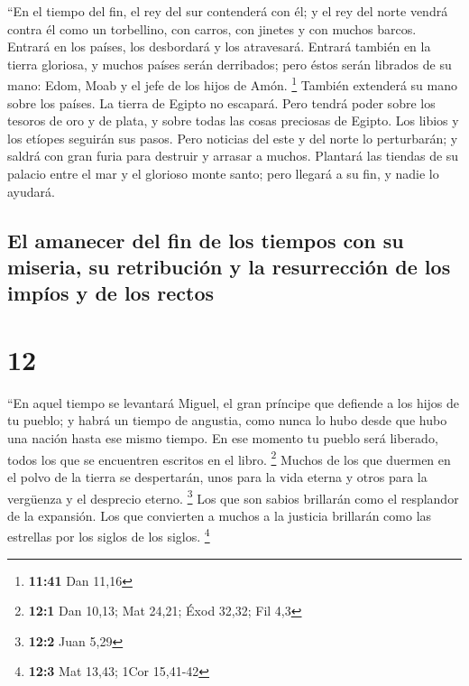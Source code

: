  ``En el tiempo del fin, el rey del sur contenderá con
él; y el rey del norte vendrá contra él como un torbellino, con carros,
con jinetes y con muchos barcos. Entrará en los países, los desbordará y
los atravesará.  Entrará también en la tierra gloriosa, y
muchos países serán derribados; pero éstos serán librados de su mano:
Edom, Moab y el jefe de los hijos de Amón. \footnote{\textbf{11:41} Dan
  11,16}  También extenderá su mano sobre los países. La
tierra de Egipto no escapará.  Pero tendrá poder sobre
los tesoros de oro y de plata, y sobre todas las cosas preciosas de
Egipto. Los libios y los etíopes seguirán sus pasos. 
Pero noticias del este y del norte lo perturbarán; y saldrá con gran
furia para destruir y arrasar a muchos.  Plantará las
tiendas de su palacio entre el mar y el glorioso monte santo; pero
llegará a su fin, y nadie lo ayudará.

\hypertarget{el-amanecer-del-fin-de-los-tiempos-con-su-miseria-su-retribuciuxf3n-y-la-resurrecciuxf3n-de-los-impuxedos-y-de-los-rectos}{%
\subsection{El amanecer del fin de los tiempos con su miseria, su
retribución y la resurrección de los impíos y de los
rectos}\label{el-amanecer-del-fin-de-los-tiempos-con-su-miseria-su-retribuciuxf3n-y-la-resurrecciuxf3n-de-los-impuxedos-y-de-los-rectos}}

\hypertarget{section-11}{%
\section{12}\label{section-11}}

 ``En aquel tiempo se levantará Miguel, el gran príncipe
que defiende a los hijos de tu pueblo; y habrá un tiempo de angustia,
como nunca lo hubo desde que hubo una nación hasta ese mismo tiempo. En
ese momento tu pueblo será liberado, todos los que se encuentren
escritos en el libro. \footnote{\textbf{12:1} Dan 10,13; Mat 24,21; Éxod
  32,32; Fil 4,3}  Muchos de los que duermen en el polvo
de la tierra se despertarán, unos para la vida eterna y otros para la
vergüenza y el desprecio eterno. \footnote{\textbf{12:2} Juan 5,29}
 Los que son sabios brillarán como el resplandor de la
expansión. Los que convierten a muchos a la justicia brillarán como las
estrellas por los siglos de los siglos. \footnote{\textbf{12:3} Mat
  13,43; 1Cor 15,41-42}

